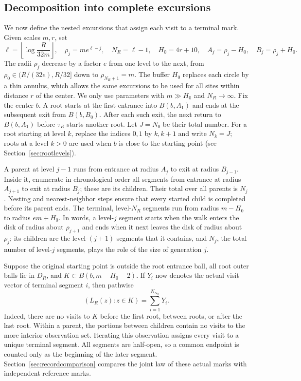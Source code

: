 \documentclass[11pt,letterpaper,reqno]{amsart}
\newif\ifrevmarks \revmarkstrue
\newcommand{\add}[1]{\ifrevmarks\textcolor{revorange}{#1}\else#1\fi}
\numberwithin{equation}{section}
\theoremstyle{remark}
\begin{document}
\subsection{Decomposition into complete excursions}\label{sec:physical}
We now define the nested excursions that assign each visit to a terminal mark. Given scales $m,r$, set
\begin{equation}\label{eq:2.20}
\ell=\left\lfloor\log\frac R{32m}\right\rfloor,\quad
\rho_j=me^{\ell-j},\quad N_R=\ell-1,\quad
H_0=4r+10,\quad A_j=\rho_j-H_0,\quad B_j=\rho_j+H_0.
\end{equation}
\add{The radii $\rho_j$ decrease by a factor $e$ from one level to the next, from $\rho_0\in(R/(32e),R/32]$ down to $\rho_{N_R+1}=m$. The buffer $H_0$ replaces each circle by a thin annulus, which allows the same excursions to be used for all sites within distance $r$ of the center.} We only use parameters with $m\gg H_0$ and $N_R\to\infty$. Fix the center $b$.
A root starts at the first entrance into $B(b,A_1)$ and ends at the subsequent exit from $B(b,B_0)$. After each such exit, the next return to $B(b,A_1)$ before $\tau_R$ starts another root. Let $J=N_0$ be their total number. For a root starting at level $k$, replace the indices $0,1$ by $k,k+1$ and write $N_k=J$\add{; roots at a level $k>0$ are used when $b$ is close to the starting point (see Section~\ref{sec:rootlevels})}.

A parent at level $j-1$ runs from entrance at radius $A_j$ to exit at radius $B_{j-1}$. Inside it, enumerate in chronological order all segments from entrance at radius $A_{j+1}$ to exit at radius $B_j$; these are its children. Their total over all parents is $N_j$. Nesting and nearest-neighbor steps ensure that every started child is completed before its parent ends. The terminal, level-$N_R$ segments run from radius $m-H_0$ to radius $em+H_0$. \add{In words, a level-$j$ segment starts when the walk enters the disk of radius about $\rho_{j+1}$ and ends when it next leaves the disk of radius about $\rho_j$; its children are the level-$(j+1)$ segments that it contains, and $N_j$, the total number of level-$j$ segments, plays the role of the size of generation $j$.}

Suppose the original starting point is outside the root entrance ball, all root outer balls lie in $D_R$, and $K\subset B(b,m-H_0-2)$. If $Y_i$ now denotes the actual visit vector of terminal segment $i$, then pathwise
\begin{equation}\label{eq:2.21}
(L_R(z):z\in K)=\sum_{i=1}^{N_{N_R}}Y_i.
\end{equation}
Indeed, there are no visits to $K$ before the first root, between roots, or after the last root. Within a parent, the portions between children contain no visits to the more interior observation set. Iterating this observation assigns every visit to a unique terminal segment. All segments are half-open, so a common endpoint is counted only as the beginning of the later segment. Section~\ref{sec:recordcomparison} compares the joint law of these actual marks with independent reference marks.
\end{document}
